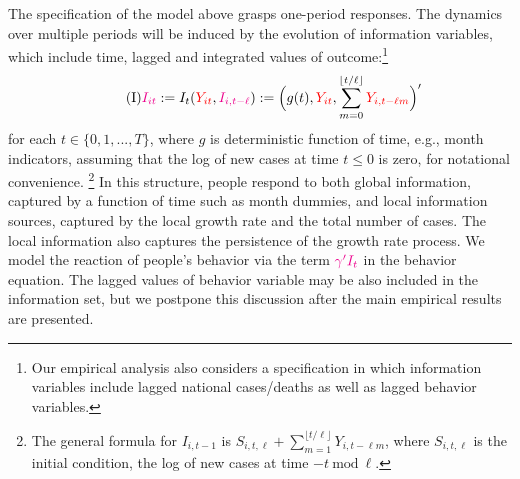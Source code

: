 \documentclass[11pt,reqno,letter]{amsart}
\theoremstyle{definition}
\def\icolor{\color{magenta}}
\def\ycolor{\color{red}}
\begin{document}


The specification of the model above grasps one-period responses.  The dynamics over multiple periods will be induced by the evolution
of information variables, which include time, lagged and integrated values of outcome:\footnote{Our empirical analysis also considers a specification in which information variables include lagged national cases/deaths as well as lagged behavior variables.}
\begin{equation}\label{eq:I}\tag{I}
 {\icolor I_{it} } := I_t( {\ycolor Y_{it}},  { \icolor  I_{i, t-\ell} }) := \Big (g(t) , {\ycolor Y_{it}},  \sum_{m=0}^{ \lfloor t/\ell \rfloor}
{\ycolor Y_{i,t - \ell m}} \Big )'  \end{equation}
 for  each  $t \in \{0,1,...,T\}$, where $g$ is deterministic function of time, e.g., month indicators,
 assuming that the log of new cases at time $t \leq 0$ is zero, for notational convenience.
 \footnote{The general formula  for  $I_{i, t-1}$ is $
S_{i, t, \ell } + \sum_{m=1}^{ \lfloor t/\ell \rfloor} Y_{i,t - \ell m}$, where $ S_{i, t, \ell }$ is the initial condition, the log of new cases at time $- t \ \mathrm{ mod } \ \ell$.} In this structure, people respond to both global information, captured by a function of time such as month dummies, and local information sources, captured by the local growth rate and the total number of cases. The local information also captures the persistence of the growth rate process.  We model the reaction of people's behavior via the term ${\icolor \gamma'I_{t}}$ in the behavior equation.  The  lagged values of behavior variable may be also included in the information set, but we postpone this discussion after the main empirical results are presented.
\end{document}
